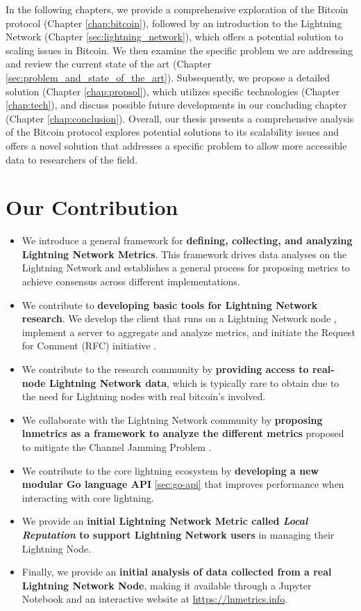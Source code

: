 In the following chapters, we provide a comprehensive exploration of the Bitcoin protocol
(Chapter \ref{chap:bitcoin}), followed by an introduction to the Lightning Network
(Chapter \ref{sec:lightning_network}), which offers a potential solution to scaling issues
in Bitcoin. We then examine the specific problem we are addressing and review the current
state of the art (Chapter \ref{sec:problem_and_state_of_the_art}). Subsequently, we propose
a detailed solution (Chapter \ref{chap:propsol}), which utilizes specific technologies
(Chapter \ref{chap:tech}), and discuss possible future developments in our concluding chapter
(Chapter \ref{chap:conclusion}). Overall, our thesis presents a comprehensive analysis of the
Bitcoin protocol explores potential solutions to its scalability issues and offers a novel
solution that addresses a specific problem to allow more accessible data to researchers of the
field.

\section*{Our Contribution}

\begin{itemize}
  \item We introduce a general framework for \textbf{defining, collecting, and analyzing Lightning Network Metrics}.
        This framework drives data analyses on the Lightning Network and establishes a general process for proposing metrics
        to achieve consensus across different implementations.
  \item We contribute to \textbf{developing basic tools for Lightning Network research}. We develop the client that runs
        on a Lightning Network node \cite{lnmetrics-client}, implement a server \cite{lnmetrics-server} to aggregate and
        analyze metrics, and initiate the Request for Comment (RFC) initiative \cite{lnmetrics-rfc}.
  \item We contribute to the research community by \textbf{providing access to real-node Lightning Network data},
        which is typically rare to obtain due to the need for Lightning nodes with real bitcoin's involved.
  \item We collaborate with the Lightning Network community \cite{lightning-network-ml-post-on-jamming} by \textbf{proposing
        lnmetrics as a framework to analyze the different metrics} proposed to mitigate the Channel Jamming Problem \cite{cryptoeprint:2022/1454}.
  \item We contribute to the core lightning ecosystem by \textbf{developing a new modular Go language API} \ref{sec:go-api}
        that improves performance when interacting with core lightning.
  \item We provide an \textbf{initial Lightning Network Metric called \emph{Local Reputation} \cite{lnmetrics_localreputation}
        to support Lightning Network users} in managing their Lightning Node.
  \item Finally, we provide an \textbf{initial analysis of data collected from a real Lightning Network Node}, making it available
        through a Jupyter Notebook \cite{lnmetrics-jupyter} and an interactive website at \url{https://lnmetrics.info}.
\end{itemize}

